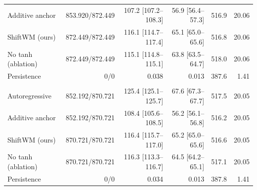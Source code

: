 \begin{table}[t]
\begin{tabular}{@{}lrrrrr@{}}
Additive anchor & 853.920/872.449 & 107.2 [107.2--108.3] & 56.9 [56.4--57.3] & 516.9 & 20.06 \\
ShiftWM (ours) & 872.449/872.449 & 116.1 [114.7--117.4] & 65.1 [65.0--65.6] & 516.8 & 20.06 \\
No tanh (ablation) & 872.449/872.449 & 115.1 [114.8--115.1] & 63.8 [63.5--64.7] & 518.0 & 20.06 \\
Persistence & 0/0 & 0.038 & 0.013 & 387.6 & 1.41 \\
\addlinespace[3pt]
\multicolumn{6}{@{}l}{\textbf{Bimanual Rope}} \\
Autoregressive & 852.192/870.721 & 125.4 [125.1--125.7] & 67.6 [67.3--67.7] & 517.5 & 20.05 \\
Additive anchor & 852.192/870.721 & 108.4 [105.6--108.5] & 56.2 [56.1--56.8] & 516.2 & 20.05 \\
ShiftWM (ours) & 870.721/870.721 & 116.4 [115.7--117.0] & 65.2 [65.0--65.6] & 516.6 & 20.05 \\
No tanh (ablation) & 870.721/870.721 & 116.3 [113.3--116.7] & 64.5 [64.2--65.1] & 517.1 & 20.05 \\
Persistence & 0/0 & 0.034 & 0.013 & 387.8 & 1.41 \\
\bottomrule\end{tabular}\endgroup
\end{table}
